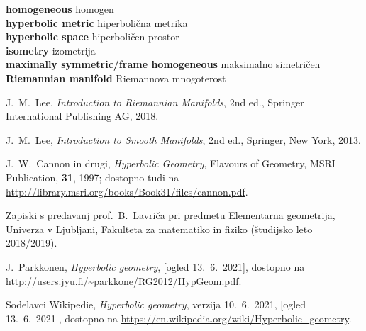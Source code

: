 \documentclass[a4paper]{article}
\newcommand{\geslo}[2]{\noindent\textbf{#1} \quad \hangindent=1cm #2\\[-1pc]}
\begin{document}
\geslo{homogeneous}{homogen}

\geslo{hyperbolic metric}{hiperbolična metrika}

\geslo{hyperbolic space}{hiperboličen prostor}

\geslo{isometry}{izometrija}

\geslo{maximally symmetric/frame homogeneous}{maksimalno simetričen}

\geslo{Riemannian manifold}{Riemannova mnogoterost}


\begin{thebibliography}{99}

 J.~M.~Lee, \emph{Introduction to Riemannian Manifolds}, 2nd ed., Springer International Publishing AG, 2018.

 J.~M.~Lee, \emph{Introduction to Smooth Manifolds}, 2nd ed., Springer, New York, 2013.

 J.~W.~Cannon in drugi, \emph{Hyperbolic Geometry}, Flavours of Geometry, MSRI Publication, \textbf{31}, 1997; dostopno tudi na \url{http://library.msri.org/books/Book31/files/cannon.pdf}.

 Zapiski s predavanj prof.~B.~Lavriča pri predmetu Elementarna geometrija, Univerza v Ljubljani, Fakulteta za matematiko in fiziko (študijsko leto 2018/2019).

 J.~Parkkonen, \emph{Hyperbolic geometry}, [ogled 13.~6.~2021], dostopno na \url{http://users.jyu.fi/~parkkone/RG2012/HypGeom.pdf}.

 Sodelavci Wikipedie, \emph{Hyperbolic geometry}, verzija 10.~6.~2021, [ogled 13.~6.~2021], dostopno na \url{https://en.wikipedia.org/wiki/Hyperbolic_geometry}.

\end{thebibliography}
\end{document}
